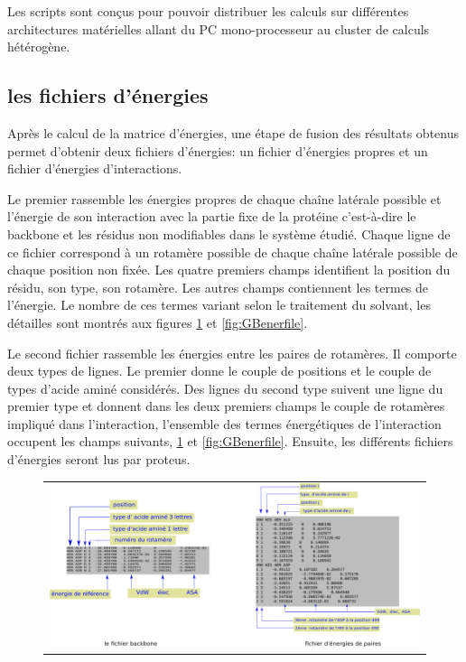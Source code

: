 Les scripts sont conçus pour pouvoir distribuer les calculs sur différentes architectures matérielles allant du PC mono-processeur au cluster de calculs hétérogène.

\subsection{les fichiers d'énergies}

Après le calcul de la matrice d'énergies, une étape de fusion des résultats obtenus permet d'obtenir deux fichiers d'énergies: un fichier d'énergies propres et un fichier d'énergies d'interactions.

Le premier rassemble les énergies propres de chaque chaîne latérale possible et l'énergie de son interaction avec la partie fixe de la protéine c'est-à-dire le backbone et les résidus non modifiables dans le système étudié. Chaque ligne de ce fichier correspond à un rotamère possible de chaque chaîne latérale possible de chaque position non fixée. Les quatre premiers champs identifient la position du résidu, son type, son rotamère. Les autres champs contiennent les termes de l'énergie. Le nombre de ces termes variant selon le traitement du solvant, les détailles sont montrés aux figures \ref{fig:CAenerfile} et \ref{fig:GBenerfile}.   

Le second fichier rassemble les énergies entre les paires de rotamères. Il comporte deux types de lignes. Le premier donne le couple de positions et le couple de types d'acide aminé considérés. Des lignes du second type suivent une ligne du premier type et donnent dans les deux premiers champs le couple de rotamères impliqué dans l'interaction, l'ensemble des termes énergétiques de l'interaction occupent les champs suivants, \ref{fig:CAenerfile} et \ref{fig:GBenerfile}. Ensuite, les différents fichiers d'énergies seront lus par proteus. 

   \begin{figure}[!htbp]
     \centering
     \begin{tabular}{c}
       \includegraphics[width=12cm]{figure/inputener.png} 
     \end{tabular}     
     \caption{}
\label{fig:CAenerfile}
   \end{figure}


